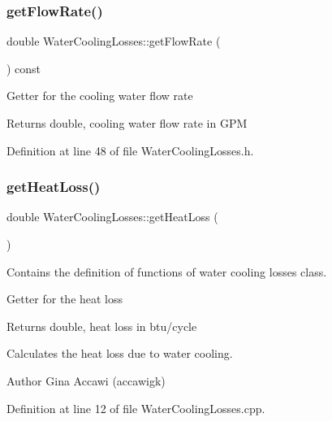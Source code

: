 \subsubsection{\texorpdfstring{get\+Flow\+Rate()}{getFlowRate()}}
{\footnotesize\ttfamily double Water\+Cooling\+Losses\+::get\+Flow\+Rate (\begin{DoxyParamCaption}{ }\end{DoxyParamCaption}) const\hspace{0.3cm}{\ttfamily [inline]}}

Getter for the cooling water flow rate

\begin{DoxyReturn}{Returns}
double, cooling water flow rate in G\+PM 
\end{DoxyReturn}


Definition at line 48 of file Water\+Cooling\+Losses.\+h.

\mbox{\label{class_water_cooling_losses_a8f884cc70d7af7add5bb1be7f837384c}} 
\subsubsection{\texorpdfstring{get\+Heat\+Loss()}{getHeatLoss()}}
{\footnotesize\ttfamily double Water\+Cooling\+Losses\+::get\+Heat\+Loss (\begin{DoxyParamCaption}{ }\end{DoxyParamCaption})}



Contains the definition of functions of water cooling losses class. 

Getter for the heat loss

\begin{DoxyReturn}{Returns}
double, heat loss in btu/cycle
\end{DoxyReturn}
Calculates the heat loss due to water cooling. \begin{DoxyAuthor}{Author}
Gina Accawi (accawigk) 
\end{DoxyAuthor}


Definition at line 12 of file Water\+Cooling\+Losses.\+cpp.

\mbox{\label{class_water_cooling_losses_a205b469029ec9cd4d792169bf8589f24}} 
